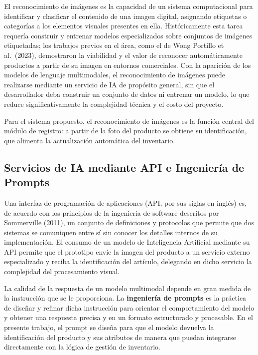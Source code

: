 \documentclass[12pt, letterpaper]{report}
\begin{document}
El reconocimiento de imágenes es la capacidad de un sistema
computacional para identificar y clasificar el contenido de una imagen
digital, asignando etiquetas o categorías a los elementos visuales
presentes en ella. Históricamente esta tarea requería construir y
entrenar modelos especializados sobre conjuntos de imágenes
etiquetadas; los trabajos previos en el área, como el de Wong Portillo
et al.\ (2023), demostraron la viabilidad y el valor de reconocer
automáticamente productos a partir de su imagen en entornos
comerciales. Con la aparición de los modelos de lenguaje multimodales,
el reconocimiento de imágenes puede realizarse mediante un servicio de
IA de propósito general, sin que el desarrollador deba construir un
conjunto de datos ni entrenar un modelo, lo que reduce
significativamente la complejidad técnica y el costo del proyecto.

Para el sistema propuesto, el reconocimiento de imágenes es la función
central del módulo de registro: a partir de la foto del producto se
obtiene su identificación, que alimenta la actualización automática del
inventario.

\subsection{Servicios de IA mediante API e Ingeniería de Prompts}

Una interfaz de programación de aplicaciones (API, por sus siglas en
inglés) es, de acuerdo con los principios de la ingeniería de software
descritos por Sommerville (2011), un conjunto de definiciones y
protocolos que permite que dos sistemas se comuniquen entre sí sin
conocer los detalles internos de su implementación. El consumo de un
modelo de Inteligencia Artificial mediante su API permite que el
prototipo envíe la imagen del producto a un servicio externo
especializado y reciba la identificación del artículo, delegando en
dicho servicio la complejidad del procesamiento visual.

La calidad de la respuesta de un modelo multimodal depende en gran
medida de la instrucción que se le proporciona. La \textbf{ingeniería
de prompts} es la práctica de diseñar y refinar dicha instrucción para
orientar el comportamiento del modelo y obtener una respuesta precisa y
en un formato estructurado y procesable. En el presente trabajo, el
prompt se diseña para que el modelo devuelva la identificación del
producto y sus atributos de manera que puedan integrarse directamente
con la lógica de gestión de inventario.
\end{document}
